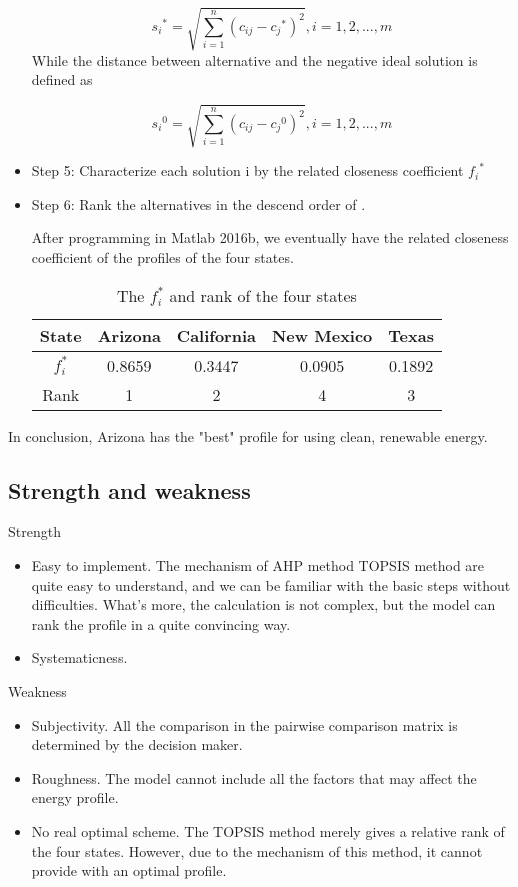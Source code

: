 \begin{itemize}
\[{s_i}^* = \sqrt {\sum\limits_{i = 1}^n {{{({c_{ij}} - {c_j}^*)}^2}} } ,i = 1,2,...,m\]
While the distance between alternative   and the negative ideal solution is defined as
	  
\[{s_i}^0 = \sqrt {\sum\limits_{i = 1}^n {{{({c_{ij}} - {c_j}^0)}^2}} } ,i = 1,2,...,m\]

\item Step 5: Characterize each solution i by the related closeness coefficient  ${f_i}^*$

\item Step 6: Rank the alternatives in the descend order of  .


After programming in Matlab 2016b, we eventually have the related closeness coefficient of the profiles of the four states.


\begin{table}[!htbp]
\center
\begin{tabular}{|c|c|c|c|c|}


\hline
 State&	Arizona&	California&	New Mexico&	Texas\\
\hline

$f_i^*$&0.8659&	0.3447&	0.0905&	0.1892\\
\hline
Rank&	1&	2	&4&	3\\

\hline
\end{tabular} 
\caption{The $f_i^*$ and rank of the four states}
\end{table}


 

\end{itemize}


In conclusion, Arizona has the "best" profile for using clean, renewable energy.

\subsection{Strength and weakness}
Strength
\begin{itemize}
\item	Easy to implement. The mechanism of AHP method TOPSIS method are quite easy to understand, and we can be familiar with the basic steps without difficulties. What's more, the calculation is not complex, but the model can rank the profile in a quite convincing way.
\item	Systematicness. 
\end{itemize}

Weakness
\begin{itemize}
\item Subjectivity. All the comparison in the pairwise comparison matrix is determined by the decision maker.
\item	Roughness. The model cannot include all the factors that may affect the energy profile.
\item	No real optimal scheme. The TOPSIS method merely gives a relative rank of the four states. However, due to the mechanism of this method, it cannot provide with an optimal profile.
\end{itemize}



